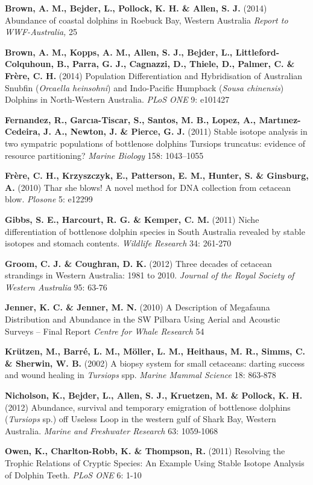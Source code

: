 \documentclass[version=last,
    paper=a4,                               %
    10pt,                                   %
    dvipsnames,
    oneside,                              %
    headings=openany,                       %
    open=any,
    BCOR=7mm,                               %
    DIV=15,     %
]{scrbook}
\begin{document}
\textbf{Brown, A. M., Bejder, L., Pollock, K. H. \& Allen, S. J.} (2014)
Abundance of coastal dolphins in Roebuck Bay, Western Australia
\emph{Report to WWF-Australia,} 25

\textbf{Brown, A. M., Kopps, A. M., Allen, S. J., Bejder, L.,
Littleford-Colquhoun, B., Parra, G. J., Cagnazzi, D., Thiele, D.,
Palmer, C. \& Frère, C. H.} (2014) Population Differentiation and
Hybridisation of Australian Snubfin (\emph{Orcaella heinsohni}) and
Indo-Pacific Humpback (\emph{Sousa chinensis}) Dolphins in North-Western
Australia. \emph{PLoS ONE} 9: e101427

\textbf{Fernandez, R., Garcıa-Tiscar, S., Santos, M. B., Lopez, A.,
Martınez-Cedeira, J. A., Newton, J. \& Pierce, G. J.} (2011) Stable
isotope analysis in two sympatric populations of bottlenose dolphins
Tursiops truncatus: evidence of resource partitioning? \emph{Marine
Biology} 158: 1043--1055

\textbf{Frère, C. H., Krzyszczyk, E., Patterson, E. M., Hunter, S. \&
Ginsburg, A.} (2010) Thar she blows! A novel method for DNA collection
from cetacean blow. \emph{Plosone} 5: e12299

\textbf{Gibbs, S. E., Harcourt, R. G. \& Kemper, C. M.} (2011) Niche
differentiation of bottlenose dolphin species in South Australia
revealed by stable isotopes and stomach contents. \emph{Wildlife
Research} 34: 261-270

\textbf{Groom, C. J. \& Coughran, D. K.} (2012) Three decades of
cetacean strandings in Western Australia: 1981 to 2010. \emph{Journal of
the Royal Society of Western Australia} 95: 63-76

\textbf{Jenner, K. C. \& Jenner, M. N.} (2010) A Description of
Megafauna Distribution and Abundance in the SW Pilbara Using Aerial and
Acoustic Surveys -- Final Report \emph{Centre for Whale Research} 54

\textbf{Krützen, M., Barré, L. M., Möller, L. M., Heithaus, M. R.,
Simms, C. \& Sherwin, W. B.} (2002) A biopsy system for small cetaceans:
darting success and wound healing in \emph{Tursiops} spp. \emph{Marine
Mammal Science} 18: 863-878

\textbf{Nicholson, K., Bejder, L., Allen, S. J., Kruetzen, M. \&
Pollock, K. H.} (2012) Abundance, survival and temporary emigration of
bottlenose dolphins (\emph{Tursiops} sp.) off Useless Loop in the
western gulf of Shark Bay, Western Australia. \emph{Marine and
Freshwater Research} 63: 1059-1068

\textbf{Owen, K., Charlton-Robb, K. \& Thompson, R.} (2011) Resolving
the Trophic Relations of Cryptic Species: An Example Using Stable
Isotope Analysis of Dolphin Teeth. \emph{PLoS ONE} 6: 1-10
\end{document}
